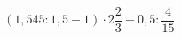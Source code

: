 \begin{ex}[type=calculate]
	\begin{condition}
		\( (1,545:1,5-1)\cdot2\dfrac{2}{3}+0,5:\dfrac{4}{15} \)
	\end{condition}
	\answer{\(  \)}
\end{ex}